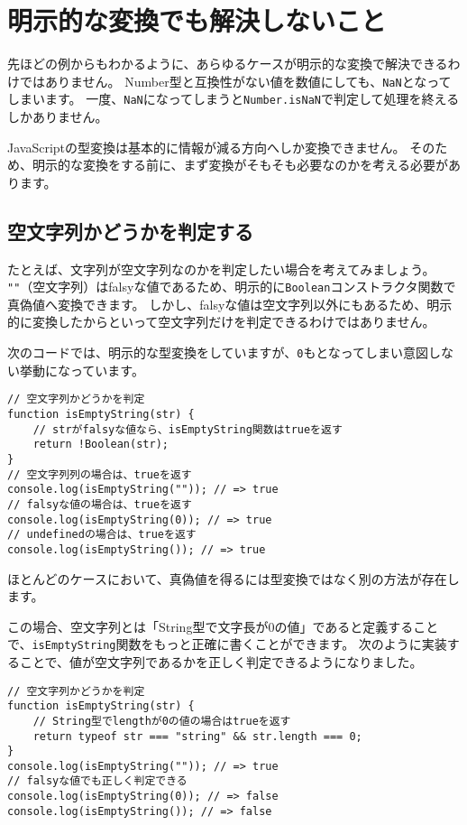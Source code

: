 \hypertarget{unsolved-problem}{%
\section{明示的な変換でも解決しないこと}\label{unsolved-problem}}

先ほどの例からもわかるように、あらゆるケースが明示的な変換で解決できるわけではありません。
Number型と互換性がない値を数値にしても、\texttt{NaN}となってしまいます。
一度、\texttt{NaN}になってしまうと\texttt{Number.isNaN}で判定して処理を終えるしかありません。

JavaScriptの型変換は基本的に情報が減る方向へしか変換できません。
そのため、明示的な変換をする前に、まず変換がそもそも必要なのかを考える必要があります。

\hypertarget{judge-empty-string}{%
\subsection{空文字列かどうかを判定する}\label{judge-empty-string}}

たとえば、文字列が空文字列なのかを判定したい場合を考えてみましょう。
\texttt{""}（空文字列）はfalsyな値であるため、明示的に\texttt{Boolean}コンストラクタ関数で真偽値へ変換できます。
しかし、falsyな値は空文字列以外にもあるため、明示的に変換したからといって空文字列だけを判定できるわけではありません。

次のコードでは、明示的な型変換をしていますが、\texttt{0}も\textbf{}となってしまい意図しない挙動になっています。

\begin{lstlisting}
// 空文字列かどうかを判定
function isEmptyString(str) {
    // strがfalsyな値なら、isEmptyString関数はtrueを返す
    return !Boolean(str);
}
// 空文字列列の場合は、trueを返す
console.log(isEmptyString("")); // => true
// falsyな値の場合は、trueを返す
console.log(isEmptyString(0)); // => true
// undefinedの場合は、trueを返す
console.log(isEmptyString()); // => true
\end{lstlisting}

ほとんどのケースにおいて、真偽値を得るには型変換ではなく別の方法が存在します。

この場合、空文字列とは「String型で文字長が0の値」であると定義することで、\texttt{isEmptyString}関数をもっと正確に書くことができます。
次のように実装することで、値が空文字列であるかを正しく判定できるようになりました。

\begin{lstlisting}
// 空文字列かどうかを判定
function isEmptyString(str) {
    // String型でlengthが0の値の場合はtrueを返す
    return typeof str === "string" && str.length === 0;
}
console.log(isEmptyString("")); // => true
// falsyな値でも正しく判定できる
console.log(isEmptyString(0)); // => false
console.log(isEmptyString()); // => false
\end{lstlisting}

